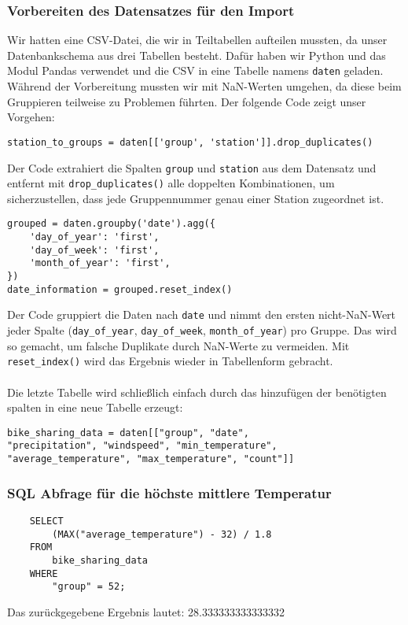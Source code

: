 \documentclass{article}
\begin{document}
\subsubsection{Vorbereiten des Datensatzes für den Import}
Wir hatten eine CSV-Datei, die wir in Teiltabellen aufteilen mussten, da unser Datenbankschema aus drei Tabellen besteht. Dafür haben wir Python und das Modul Pandas verwendet und die CSV in eine Tabelle namens \texttt{daten} geladen. Während der Vorbereitung mussten wir mit NaN-Werten umgehen, da diese beim Gruppieren teilweise zu Problemen führten. Der folgende Code zeigt unser Vorgehen:
\begin{lstlisting}
station_to_groups = daten[['group', 'station']].drop_duplicates()
\end{lstlisting}
Der Code extrahiert die Spalten \texttt{group} und \texttt{station} aus dem Datensatz und entfernt mit \texttt{drop\_duplicates()} alle doppelten Kombinationen, um sicherzustellen, dass jede Gruppennummer genau einer Station zugeordnet ist.
\begin{lstlisting}
grouped = daten.groupby('date').agg({
    'day_of_year': 'first',
    'day_of_week': 'first',
    'month_of_year': 'first',
})
date_information = grouped.reset_index()
\end{lstlisting}
Der Code gruppiert die Daten nach \texttt{date} und nimmt den ersten nicht-NaN-Wert jeder Spalte (\texttt{day\_of\_year}, \texttt{day\_of\_week}, \texttt{month\_of\_year}) pro Gruppe. Das wird so gemacht, um falsche Duplikate durch NaN-Werte zu vermeiden. Mit \texttt{reset\_index()} wird das Ergebnis wieder in Tabellenform gebracht.\\\\
Die letzte Tabelle wird schließlich einfach durch das hinzufügen der benötigten spalten in eine neue Tabelle erzeugt:
\begin{lstlisting}
bike_sharing_data = daten[["group", "date",
"precipitation", "windspeed", "min_temperature",
"average_temperature", "max_temperature", "count"]]
\end{lstlisting}

\subsubsection{SQL Abfrage für die höchste mittlere Temperatur}
\begin{verbatim}
    SELECT 
        (MAX("average_temperature") - 32) / 1.8
    FROM 
        bike_sharing_data
    WHERE 
        "group" = 52;
\end{verbatim}
Das zurückgegebene Ergebnis lautet: 28.333333333333332
\newpage


\end{document}
